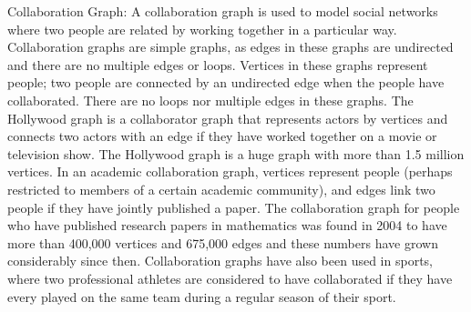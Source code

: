 \documentclass[12pt]{article}
\begin{document}
\begin{example} Collaboration Graph: A collaboration graph is used to model social networks where two people are related by working together in a particular way. Collaboration graphs are simple graphs, as edges in these graphs are undirected and there are no multiple edges or loops. Vertices in these graphs represent people; two people are connected by an undirected edge when the people have collaborated. There are no loops nor multiple edges in these graphs. The Hollywood graph is a collaborator graph that represents actors by vertices and connects two actors with an edge if they have worked together on a movie or television show. The Hollywood graph is a huge graph with more than 1.5 million vertices. In an academic collaboration graph, vertices represent people (perhaps restricted to members of a certain academic community), and edges link two people if they have jointly published a paper. The collaboration graph for people who have published research papers in mathematics was found in 2004 to have more than 400,000 vertices and 675,000 edges and these numbers have grown considerably since then. Collaboration graphs have also been used in sports, where two professional athletes are considered to have collaborated if they have every played on the same team during a regular season of their sport. \end{example} 
\end{document}
